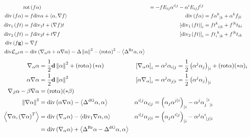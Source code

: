 \documentclass[a4paper,10pt]{scrartcl}
\newcommand{\exd}{\mathbf{d}}
\newcommand{\rot}{\mathrm{rot}}
\renewcommand{\div}{\mathrm{div}}
\newcommand{\lie}{\mathcal{L}}
\newcommand{\laplace}[1]{\Delta^{#1}}
\newcommand{\ldivgrad}{\laplace{\textup{dG}}}
\newcommand{\lrotrot}{\laplace{\textup{Rr}}}
\newcommand{\gb}{\mathbf{g}}
\begin{document}
\begin{align*}
                &\rot\left( f\alpha \right) &= -fE_{ij}\alpha^{i|j} - \alpha^{i}E_{ij}f^{|j}\\
    \div\left( f\alpha \right) &= f\div\alpha + \left\langle \alpha, \nabla f \right\rangle
                &\div\left( f\alpha \right) &= f\tensor{\alpha}{^{k}_{|k}} + \alpha^{k}f_{|k}\\
    \div_{1}\left( f t \right) &= f\div_{1}t + (\nabla f)t
                &\left[  \div_{1}\left( f t \right) \right]_{i} &= f\tensor{t}{^{k}_{i|k}} + f^{|k}t_{ki}\\
    \div_{2}\left( f t \right) &= f\div_{2}t + t\nabla f
                &\left[  \div_{2}\left( f t \right) \right]_{i} &= f\tensor{t}{_{i}^{k}_{|k}} + f^{|k}t_{ik}\\
    \div\left( f \gb \right) &= \nabla f \\
    \div\lie_{\alpha^{\sharp}}\alpha &= \div\left( \nabla_{\alpha}\alpha +  \alpha\nabla\alpha \right)
                = \Delta\left\| \alpha \right\|^{2} - \left( \rot\alpha \right)^{2} - \left\langle \lrotrot\alpha , \alpha \right\rangle
  \end{align*}
  \begin{align*}
    \nabla_{\alpha}\alpha &= \frac{1}{2}\exd\left\| \alpha \right\|^{2} + \left( \rot\alpha \right)\left( *\alpha \right)
                &\left[ \nabla_{\alpha}\alpha \right]_{i} 
                    &= \alpha^{j}\alpha_{i|j}
                      = \frac{1}{2}\left( \alpha^{j}\alpha_{j} \right)_{|i} + (\rot\alpha)(*\alpha)_{i} \\
    \alpha\nabla\alpha &= \frac{1}{2}\exd\left\| \alpha \right\|^{2}
                &\left[ \alpha\nabla_{\alpha} \right]_{i} &= \alpha^{j}\alpha_{j|i}
                          = \frac{1}{2}\left( \alpha^{j}\alpha_{j} \right)_{|i}\\
    \nabla_{\beta}\alpha-\beta\nabla\alpha &= (\rot\alpha)(*\beta)\\
    \left\| \nabla\alpha \right\|^{2} &= \div\left( \alpha\nabla\alpha \right) - \left\langle \ldivgrad\alpha , \alpha \right\rangle
            &\alpha^{i|j}\alpha_{i|j} &= \left( \alpha_{j}\alpha^{j|i} \right)_{|i} - \alpha^{j}\tensor{\alpha}{_{j}^{|i}_{|i}}\\
    \left\langle \nabla\alpha,\left( \nabla\alpha \right)^{T} \right\rangle 
        &= \div\left( \nabla_{\alpha}\alpha \right) - \left\langle \div_{1}\nabla\alpha, \alpha \right\rangle
            &\alpha^{i|j}\alpha_{j|i} &= \left( \alpha_{j}\alpha^{i|j} \right)_{|i} - \alpha^{j}\tensor{\alpha}{^{i}_{|j|i}}\\
        &= \div\left( \nabla_{\alpha}\alpha \right) + \left\langle \lrotrot\alpha - \ldivgrad\alpha , \alpha \right\rangle
  \end{align*}
\end{document}
